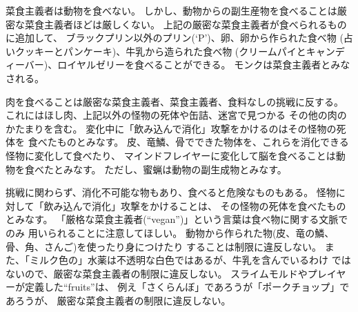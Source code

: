 菜食主義者は動物を食べない。
しかし、動物からの副生産物を食べることは厳密な菜食主義者ほどは厳しくない。
上記の厳密な菜食主義者が食べられるものに追加して、
ブラックプリン以外のプリン(`P')、卵、卵から作られた食べ物
(占いクッキーとパンケーキ)、牛乳から造られた食べ物
(クリームパイとキャンディーバー)、ロイヤルゼリーを食べることができる。
モンクは菜食主義者とみなされる。

肉を食べることは厳密な菜食主義者、菜食主義者、食料なしの挑戦に反する。
これにはほし肉、上記以外の怪物の死体や缶詰、迷宮で見つかる
その他の肉のかたまりを含む。
変化中に「飲み込んで消化」攻撃をかけるのはその怪物の死体を
食べたものとみなす。
皮、竜鱗、骨でできた物体を、これらを消化できる怪物に変化して食べたり、
マインドフレイヤーに変化して脳を食べることは動物を食べたとみなす。
ただし、蜜蝋は動物の副生成物とみなす。

挑戦に関わらず、消化不可能な物もあり、食べると危険なものもある。
怪物に対して「飲み込んで消化」攻撃をかけることは、
その怪物の死体を食べたものとみなす。
「厳格な菜食主義者(``vegan'')」という言葉は食べ物に関する文脈でのみ
用いられることに注意してほしい。
動物から作られた物(皮、竜の鱗、骨、角、さんご)を使ったり身につけたり
することは制限に違反しない。
また、「ミルク色の」水薬は不透明な白色ではあるが、牛乳を含んでいるわけ
ではないので、厳密な菜食主義者の制限に違反しない。
スライムモルドやプレイヤーが定義した``fruits''は、
例え「さくらんぼ」であろうが「ポークチョップ」であろうが、
厳密な菜食主義者の制限に違反しない。

